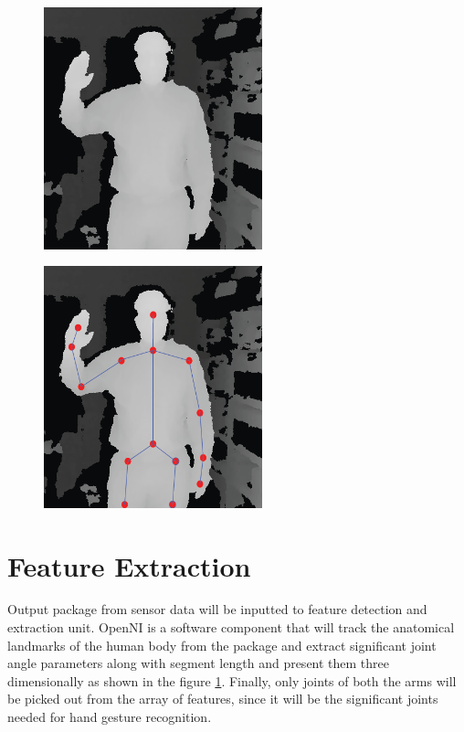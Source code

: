 \begin{figure}
	\centering
	\begin{minipage}{.5\textwidth}
		\centering
\includegraphics[height=7cm]{figures/depth.png} 
		\label{fig:depth}
	\end{minipage}%
	\begin{minipage}{.5\textwidth}
		\centering
		\includegraphics[height=7cm]{figures/depth-skeleton.png}
		\label{fig:skeleton}
	\end{minipage}
\end{figure}

\section{Feature Extraction}
Output package from sensor data will be inputted to feature detection and extraction unit. OpenNI is a software component that will track the anatomical landmarks of the human body from the package and extract significant joint angle parameters along with segment length and present them three dimensionally as shown in the figure \ref{fig:skeleton}. Finally, only joints of both the arms will be picked out from the array of features, since it will be the significant joints needed for hand gesture recognition.


